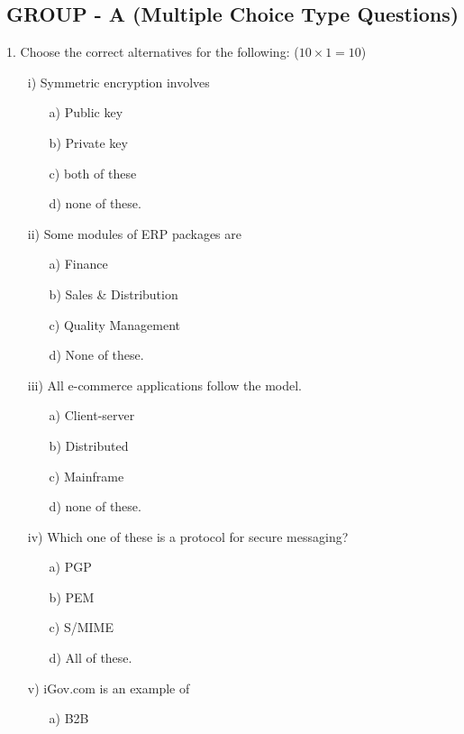 \documentclass{article}
\begin{document}
\subsection*{GROUP - A (Multiple Choice Type Questions)}
1. Choose the correct alternatives for the following: ($10 \times 1 = 10$)
\begin{enumerate}
    \item[i)] Symmetric encryption involves
    \begin{enumerate}
        \item[a)] Public key
        \item[b)] Private key
        \item[c)] both of these
        \item[d)] none of these.
    \end{enumerate}
    \item[ii)] Some modules of ERP packages are
    \begin{enumerate}
        \item[a)] Finance
        \item[b)] Sales \& Distribution
        \item[c)] Quality Management
        \item[d)] None of these.
    \end{enumerate}
    \item[iii)] All e-commerce applications follow the \underline{\hspace{2cm}} model.
    \begin{enumerate}
        \item[a)] Client-server
        \item[b)] Distributed
        \item[c)] Mainframe
        \item[d)] none of these.
    \end{enumerate}
    \item[iv)] Which one of these is a protocol for secure messaging?
    \begin{enumerate}
        \item[a)] PGP
        \item[b)] PEM
        \item[c)] S/MIME
        \item[d)] All of these.
    \end{enumerate}
    \item[v)] iGov.com is an example of
    \begin{enumerate}
        \item[a)] B2B

\end{enumerate}
\end{enumerate}
\end{document}

